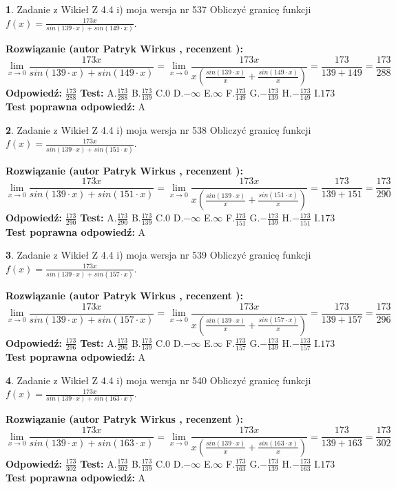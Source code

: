 \documentclass[12pt, a4paper]{article}
\theoremstyle{definition} %
\newtheorem{zad}{}
\newcommand{\zadStart}[1]{\begin{zad}#1\newline}
\newcommand{\zadStop}{\end{zad}}
\newcommand{\rozwStart}[2]{\noindent \textbf{Rozwiązanie (autor #1 , recenzent #2): }\newline}
\newcommand{\rozwStop}{\newline}
\newcommand{\odpStart}{\noindent \textbf{Odpowiedź:}\newline}
\newcommand{\odpStop}{\newline}
\newcommand{\testStart}{\noindent \textbf{Test:}\newline}
\newcommand{\testStop}{\newline}
\newcommand{\kluczStart}{\noindent \textbf{Test poprawna odpowiedź:}\newline}
\newcommand{\kluczStop}{\newline}
\begin{document}
\zadStart{Zadanie z Wikieł Z 4.4 i) moja wersja nr 537}
Obliczyć granicę funkcji $f(x)=\frac{173x}{sin(139\cdot x) +sin(149\cdot x)}$.
\zadStop
\rozwStart{Patryk Wirkus}{}
$$\lim\limits_{x\to 0}\frac{173x}{sin(139\cdot x) +sin(149\cdot x)}=\lim\limits_{x\to 0}\frac{173x}{x(\frac{sin(139\cdot x)}{x}+\frac{sin(149\cdot x)}{x})}=\frac{173}{139+149} = \frac{173}{288}$$
\rozwStop
\odpStart
$\frac{173}{288}$
\odpStop
\testStart
A.$\frac{173}{288}$
B.$\frac{173}{139}$
C.$0$
D.$-\infty$
E.$\infty$
F.$\frac{173}{149}$
G.$-\frac{173}{139}$
H.$-\frac{173}{149}$
I.$173$
\testStop
\kluczStart
A
\kluczStop



\zadStart{Zadanie z Wikieł Z 4.4 i) moja wersja nr 538}
Obliczyć granicę funkcji $f(x)=\frac{173x}{sin(139\cdot x) +sin(151\cdot x)}$.
\zadStop
\rozwStart{Patryk Wirkus}{}
$$\lim\limits_{x\to 0}\frac{173x}{sin(139\cdot x) +sin(151\cdot x)}=\lim\limits_{x\to 0}\frac{173x}{x(\frac{sin(139\cdot x)}{x}+\frac{sin(151\cdot x)}{x})}=\frac{173}{139+151} = \frac{173}{290}$$
\rozwStop
\odpStart
$\frac{173}{290}$
\odpStop
\testStart
A.$\frac{173}{290}$
B.$\frac{173}{139}$
C.$0$
D.$-\infty$
E.$\infty$
F.$\frac{173}{151}$
G.$-\frac{173}{139}$
H.$-\frac{173}{151}$
I.$173$
\testStop
\kluczStart
A
\kluczStop



\zadStart{Zadanie z Wikieł Z 4.4 i) moja wersja nr 539}
Obliczyć granicę funkcji $f(x)=\frac{173x}{sin(139\cdot x) +sin(157\cdot x)}$.
\zadStop
\rozwStart{Patryk Wirkus}{}
$$\lim\limits_{x\to 0}\frac{173x}{sin(139\cdot x) +sin(157\cdot x)}=\lim\limits_{x\to 0}\frac{173x}{x(\frac{sin(139\cdot x)}{x}+\frac{sin(157\cdot x)}{x})}=\frac{173}{139+157} = \frac{173}{296}$$
\rozwStop
\odpStart
$\frac{173}{296}$
\odpStop
\testStart
A.$\frac{173}{296}$
B.$\frac{173}{139}$
C.$0$
D.$-\infty$
E.$\infty$
F.$\frac{173}{157}$
G.$-\frac{173}{139}$
H.$-\frac{173}{157}$
I.$173$
\testStop
\kluczStart
A
\kluczStop



\zadStart{Zadanie z Wikieł Z 4.4 i) moja wersja nr 540}
Obliczyć granicę funkcji $f(x)=\frac{173x}{sin(139\cdot x) +sin(163\cdot x)}$.
\zadStop
\rozwStart{Patryk Wirkus}{}
$$\lim\limits_{x\to 0}\frac{173x}{sin(139\cdot x) +sin(163\cdot x)}=\lim\limits_{x\to 0}\frac{173x}{x(\frac{sin(139\cdot x)}{x}+\frac{sin(163\cdot x)}{x})}=\frac{173}{139+163} = \frac{173}{302}$$
\rozwStop
\odpStart
$\frac{173}{302}$
\odpStop
\testStart
A.$\frac{173}{302}$
B.$\frac{173}{139}$
C.$0$
D.$-\infty$
E.$\infty$
F.$\frac{173}{163}$
G.$-\frac{173}{139}$
H.$-\frac{173}{163}$
I.$173$
\testStop
\kluczStart
A
\kluczStop
\end{document}
